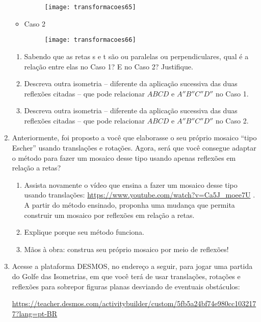 \begin{enumerate}
\begin{itemize}
\begin{figure}[H]
 \texttt{[image: transformacoes65]}
 \end{figure}

\item Caso 2
 \begin{figure}[H]
 \centering
 
 \texttt{[image: transformacoes66]}
 \end{figure}
\end{itemize}


\begin{enumerate}
\item Sabendo que as retas s e t são ou paralelas ou perpendiculares, qual é a relação entre elas no Caso 1? E no Caso 2? Justifique.
\item Descreva outra isometria – diferente da aplicação sucessiva das duas reflexões citadas – que pode relacionar $ABCD$ e $A''B''C''D''$ no Caso 1.
\item Descreva outra isometria – diferente da aplicação sucessiva das duas reflexões citadas – que pode relacionar $ABCD$ e $A''B''C''D''$ no Caso 2.
\end{enumerate}

\item Anteriormente, foi proposto a você que elaborasse o seu próprio mosaico “tipo Escher” usando translações e rotações. Agora, será que você consegue adaptar o método para fazer um mosaico desse tipo usando apenas reflexões em relação a retas? 
\begin{enumerate}
\item Assista novamente o vídeo que ensina a fazer um mosaico desse tipo usando translações: \url{https://www.youtube.com/watch?v=Ca5J_moee7U} . A partir do método ensinado, proponha uma mudança que permita construir um mosaico por reflexões em relação a retas.
\item Explique porque seu método funciona.
\item Mãos à obra: construa seu próprio mosaico por meio de reflexões!
\end{enumerate}

\item Acesse a plataforma DESMOS, no endereço a seguir, para jogar uma partida do Golfe das Isometrias, em que você terá de usar translações, rotações e reflexões para sobrepor figuras planas desviando de eventuais obstáculos:

\url{https://teacher.desmos.com/activitybuilder/custom/5fb5a24bf74e980cc1032177?lang=pt-BR}
\end{enumerate}

